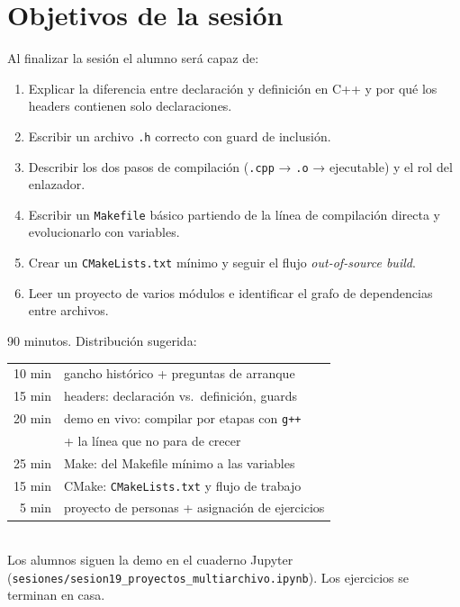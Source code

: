 \documentclass[12pt, oneside]{article}
\begin{document}

\tableofcontents
\newpage

\section{Objetivos de la sesión}

Al finalizar la sesión el alumno será capaz de:

\begin{enumerate}
  \item Explicar la diferencia entre declaración y definición en C++ y por
        qué los headers contienen solo declaraciones.
  \item Escribir un archivo \texttt{.h} correcto con guard de inclusión.
  \item Describir los dos pasos de compilación (\texttt{.cpp} → \texttt{.o}
        → ejecutable) y el rol del enlazador.
  \item Escribir un \texttt{Makefile} básico partiendo de la línea de
        compilación directa y evolucionarlo con variables.
  \item Crear un \texttt{CMakeLists.txt} mínimo y seguir el flujo
        \textit{out-of-source build}.
  \item Leer un proyecto de varios módulos e identificar el grafo de
        dependencias entre archivos.
\end{enumerate}

\begin{notaprofesor}
  90 minutos.  Distribución sugerida:\\[2pt]
  \begin{tabular}{rl}
    10 min & gancho histórico + preguntas de arranque \\
    15 min & headers: declaración vs.\ definición, guards \\
    20 min & demo en vivo: compilar por etapas con \texttt{g++} \\
           & + la línea que no para de crecer \\
    25 min & Make: del Makefile mínimo a las variables \\
    15 min & CMake: \texttt{CMakeLists.txt} y flujo de trabajo \\
     5 min & proyecto de personas + asignación de ejercicios \\
  \end{tabular}\\[4pt]
  Los alumnos siguen la demo en el cuaderno Jupyter
  (\texttt{sesiones/sesion19\_proyectos\_multiarchivo.ipynb}).
  Los ejercicios se terminan en casa.
\end{notaprofesor}
\end{document}
